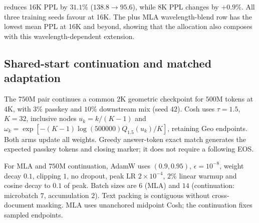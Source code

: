 \begin{table}[ht]
\caption{MLA validation (432M, $d_{\mathrm{rope}}{=}32$, 3-seed mean
$\pm$ std). Rows marked ``MLA wavelength-blend'' use this run's wavelength-blend
operator defined above.}
\label{tab:mla}
\centering
\small
{}
\end{table}

\evq{} reduces 16K PPL by $31.1\%$ ($138.8\to95.6$), while 8K PPL changes by
$+0.9\%$. All three training seeds favour \evq{} at 16K. The \evq{} plus MLA wavelength-blend
row has the lowest mean PPL at 16K and beyond, showing that the allocation
also composes with this wavelength-dependent extension.



\FloatBarrier



\subsection{Shared-start continuation and matched adaptation}
\label{sec:learning-summary}\label{sec:larger-scale-supporting}\label{sec:experiment-details}
The $750$M pair continues a common $2$K geometric checkpoint for $500$M
tokens at $4$K, with $3\%$ passkey and $10\%$ downstream mix (seed $42$).
Cosh uses $\tau=1.5$, $K=32$, inclusive nodes $u_k=k/(K-1)$ and
$\omega_k=\exp[-(K-1)\log(500000)Q_{1.5}(u_k)/K]$, retaining Geo endpoints.
Both arms update all weights. Greedy answer-token exact match generates the
expected passkey tokens and closing marker; it does not require a following EOS.


For MLA and $750$M continuation, AdamW uses $(0.9,0.95)$, $\epsilon=10^{-8}$,
weight decay $0.1$, clipping $1$, no dropout, peak LR $2\times10^{-4}$,
$2\%$ linear warmup and cosine decay to $0.1$ of peak. Batch sizes are $6$
(MLA) and $14$ (continuation: microbatch $7$, accumulation $2$). Text packing
is contiguous without cross-document masking. MLA uses unanchored midpoint
Cosh; the continuation fixes sampled endpoints.


